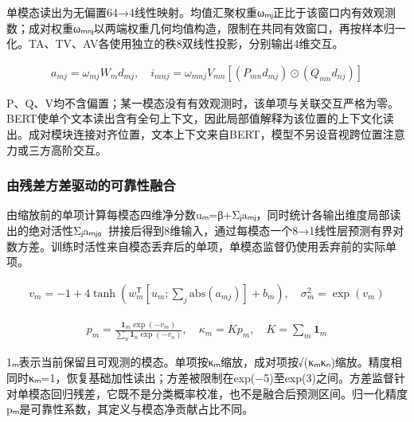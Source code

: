 单模态读出为无偏置64→4线性映射。均值汇聚权重ωₘⱼ正比于该窗口内有效观测数；成对权重ωₘₙⱼ以两端权重几何均值构造，限制在共同有效窗口，再按样本归一化。TA、TV、AV各使用独立的秩8双线性投影，分别输出4维交互。

\begin{equation}
\begin{gathered}a_{mj}=\omega_{mj}W_md_{mj},\quad i_{mnj}=\omega_{mnj}V_{mn}[(P_{mn}d_{mj})\odot(Q_{mn}d_{nj})]\end{gathered}\label{q3-eq2}
\end{equation}

P、Q、V均不含偏置；某一模态没有有效观测时，该单项与关联交互严格为零。BERT使单个文本读出含有全句上下文，因此局部值解释为该位置的上下文化读出。成对模块连接对齐位置，文本上下文来自BERT，模型不另设音视跨位置注意力或三方高阶交互。

\hypertarget{q3-ux7531ux6b8bux5deeux65b9ux5deeux9a71ux52a8ux7684ux53efux9760ux6027ux878dux5408}{%
\subsubsection{由残差方差驱动的可靠性融合}\label{q3-ux7531ux6b8bux5deeux65b9ux5deeux9a71ux52a8ux7684ux53efux9760ux6027ux878dux5408}}

由缩放前的单项计算每模态四维净分数uₘ=β+Σⱼaₘⱼ，同时统计各输出维度局部读出的绝对活性Σⱼ\textbar aₘⱼ\textbar。拼接后得到8维输入，通过每模态一个8→1线性层预测有界对数方差。训练时活性来自模态丢弃后的单项，单模态监督仍使用丢弃前的实际单项。

\begin{equation}
\begin{gathered}v_m=-1+4\tanh(w_m^{\mathsf T}[u_m;\sum_j\mathrm{abs}(a_{mj})]+b_m),\quad \sigma_m^2=\exp(v_m)\end{gathered}\label{q3-eq3}
\end{equation}

\begin{equation}
\begin{gathered}p_m=\frac{\mathbf1_m\exp(-v_m)}{\sum_n\mathbf1_n\exp(-v_n)},\quad \kappa_m=Kp_m,\quad K=\sum_m\mathbf1_m\end{gathered}\label{q3-eq4}
\end{equation}

1ₘ表示当前保留且可观测的模态。单项按κₘ缩放，成对项按√(κₘκₙ)缩放。精度相同时κₘ=1，恢复基础加性读出；方差被限制在exp(−5)至exp(3)之间。方差监督针对单模态回归残差，它既不是分类概率校准，也不是融合后预测区间。归一化精度pₘ是可靠性系数，其定义与模态净贡献占比不同。

